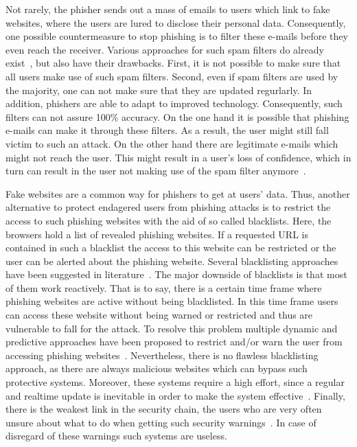 \begin{description}[leftmargin=0cm]
	\item[Spam filters] Not rarely, the phisher sends out a mass of emails to users which link to fake websites, where the users are lured to disclose their personal data. Consequently, one possible countermeasure to stop phishing is to filter these e-mails before they even reach the receiver. Various approaches for such spam filters do already exist~\cite{bergholz2010new,chandrasekaran2006phishing,fette2007learning}, but also have their drawbacks. First, it is not possible to make sure that all users make use of such spam filters. Second, even if spam filters are used by the majority, one can not make sure that they are updated regurlarly. In addition, phishers are able to adapt to improved technology. Consequently, such filters can not assure 100\% accuracy. On the one hand it is possible that phishing e-mails can make it through these filters. As a result, the user might still fall victim to such an attack. On the other hand there are legitimate e-mails which might not reach the user. This might result in a user's loss of confidence, which in turn can result in the user not making use of the spam filter anymore~\cite{olivo2011obtaining}.
	\item[Blacklists] Fake websites are a common way for phishers to get at users' data. Thus, another alternative to protect endagered users from phishing attacks is to restrict the access to such phishing websites with the aid of so called blacklists. Here, the browsers hold a list of revealed phishing websites. If a requested URL is contained in such a blacklist the access to this website can be restricted or the user can be alerted about the phishing website. Several blacklisting approaches have been suggested in literature~\cite{ma2009beyond, zhang2008highly}. The major downside of blacklists is that most of them work reactively. That is to say, there is a certain time frame where phishing websites are active without being blacklisted. In this time frame users can access these website without being warned or restricted and thus are vulnerable to fall for the attack. To resolve this problem multiple dynamic and predictive approaches have been proposed to restrict and/or warn the user from accessing phishing websites~\cite{prakash2010phishnet, obied2009fraudulent}. Nevertheless, there is no flawless blacklisting approach, as there are always malicious websites which can bypass such protective systems. Moreover, these systems require a high effort, since a regular and realtime update is inevitable in order to make the system effective~\cite{purkait2012phishing}. Finally, there is the weakest link in the security chain, the users who are very often unsure about what to do when getting such security warnings~\cite{bakhshi2009social}. In case of disregard of these warnings such systems are useless.

\end{description}
